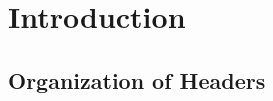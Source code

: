 %
%
%
%

\chapter{Introduction}
\label{chap:Introduction}

\section{Organization of Headers}
\label{sec:Organization of Headers}

